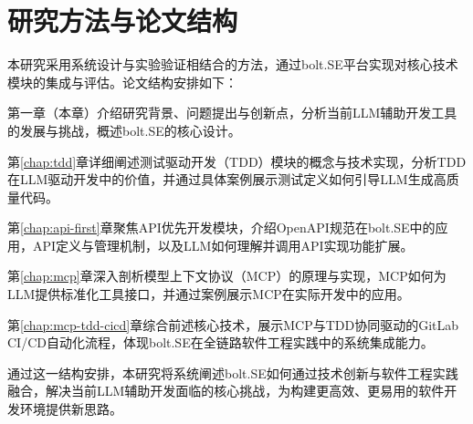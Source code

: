 \section{研究方法与论文结构}

本研究采用系统设计与实验验证相结合的方法，通过bolt.SE平台实现对核心技术模块的集成与评估。论文结构安排如下：

第一章（本章）介绍研究背景、问题提出与创新点，分析当前LLM辅助开发工具的发展与挑战，概述bolt.SE的核心设计。

第\ref{chap:tdd}章详细阐述测试驱动开发（TDD）模块的概念与技术实现，分析TDD在LLM驱动开发中的价值，并通过具体案例展示测试定义如何引导LLM生成高质量代码。

第\ref{chap:api-first}章聚焦API优先开发模块，介绍OpenAPI规范在bolt.SE中的应用，API定义与管理机制，以及LLM如何理解并调用API实现功能扩展。

第\ref{chap:mcp}章深入剖析模型上下文协议（MCP）的原理与实现，MCP如何为LLM提供标准化工具接口，并通过案例展示MCP在实际开发中的应用。

第\ref{chap:mcp-tdd-cicd}章综合前述核心技术，展示MCP与TDD协同驱动的GitLab CI/CD自动化流程，体现bolt.SE在全链路软件工程实践中的系统集成能力。

通过这一结构安排，本研究将系统阐述bolt.SE如何通过技术创新与软件工程实践融合，解决当前LLM辅助开发面临的核心挑战，为构建更高效、更易用的软件开发环境提供新思路。